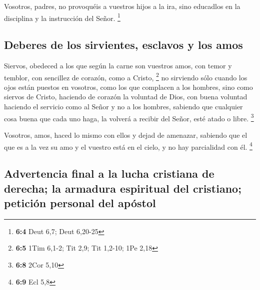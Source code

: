 \begin{paracol}{2}
 Vosotros, padres, no provoquéis a vuestros hijos a la
ira, sino educadlos en la disciplina y la instrucción del Señor.
\footnote{\textbf{6:4} Deut 6,7; Deut 6,20-25}

\hypertarget{deberes-de-los-sirvientes-esclavos-y-los-amos}{%
\subsection{Deberes de los sirvientes, esclavos y los
amos}\label{deberes-de-los-sirvientes-esclavos-y-los-amos}}

 Siervos, obedeced a los que según la carne son vuestros
amos, con temor y temblor, con sencillez de corazón, como a Cristo,
\footnote{\textbf{6:5} 1Tim 6,1-2; Tit 2,9; Tit 1,2-10; 1Pe 2,18}
 no sirviendo sólo cuando los ojos están puestos en
vosotros, como los que complacen a los hombres, sino como siervos de
Cristo, haciendo de corazón la voluntad de Dios,  con
buena voluntad haciendo el servicio como al Señor y no a los hombres,
 sabiendo que cualquier cosa buena que cada uno haga, la
volverá a recibir del Señor, esté atado o libre. \footnote{\textbf{6:8}
  2Cor 5,10}

 Vosotros, amos, haced lo mismo con ellos y dejad de
amenazar, sabiendo que el que es a la vez su amo y el vuestro está en el
cielo, y no hay parcialidad con él. \footnote{\textbf{6:9} Ecl 5,8}

\hypertarget{advertencia-final-a-la-lucha-cristiana-de-derecha-la-armadura-espiritual-del-cristiano-peticiuxf3n-personal-del-apuxf3stol}{%
\subsection{Advertencia final a la lucha cristiana de derecha; la
armadura espiritual del cristiano; petición personal del
apóstol}\label{advertencia-final-a-la-lucha-cristiana-de-derecha-la-armadura-espiritual-del-cristiano-peticiuxf3n-personal-del-apuxf3stol}}


\end{paracol}
